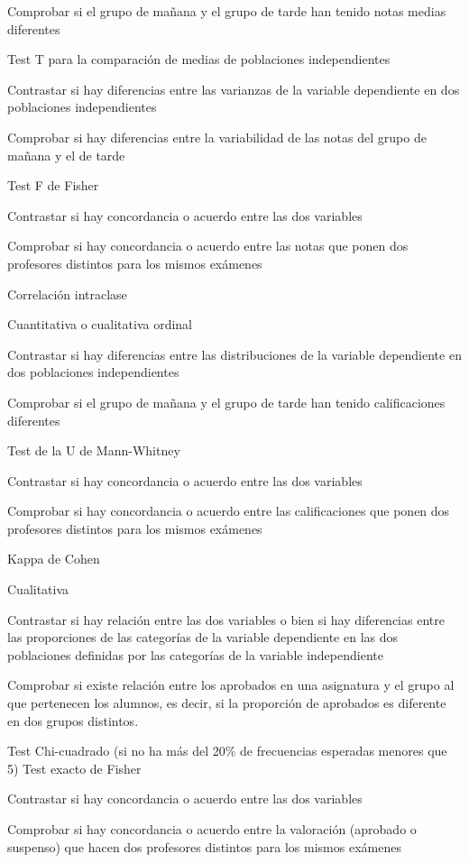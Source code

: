 \documentclass[
  spanish,
  a4paper,
]{scrreport}
\theoremstyle{definition}
\theoremstyle{definition}
\theoremstyle{remark}
\begin{document}
Comprobar si el grupo de mañana y el grupo de tarde han tenido notas
medias diferentes

Test T para la comparación de medias de poblaciones independientes

Contrastar si hay diferencias entre las varianzas de la variable
dependiente en dos poblaciones independientes

Comprobar si hay diferencias entre la variabilidad de las notas del
grupo de mañana y el de tarde

Test F de Fisher

Contrastar si hay concordancia o acuerdo entre las dos variables

Comprobar si hay concordancia o acuerdo entre las notas que ponen dos
profesores distintos para los mismos exámenes

Correlación intraclase

Cuantitativa o cualitativa ordinal

Contrastar si hay diferencias entre las distribuciones de la variable
dependiente en dos poblaciones independientes

Comprobar si el grupo de mañana y el grupo de tarde han tenido
calificaciones diferentes

Test de la U de Mann-Whitney

Contrastar si hay concordancia o acuerdo entre las dos variables

Comprobar si hay concordancia o acuerdo entre las calificaciones que
ponen dos profesores distintos para los mismos exámenes

Kappa de Cohen

Cualitativa

Contrastar si hay relación entre las dos variables o bien si hay
diferencias entre las proporciones de las categorías de la variable
dependiente en las dos poblaciones definidas por las categorías de la
variable independiente

Comprobar si existe relación entre los aprobados en una asignatura y el
grupo al que pertenecen los alumnos, es decir, si la proporción de
aprobados es diferente en dos grupos distintos.

Test Chi-cuadrado (si no ha más del 20\% de frecuencias esperadas
menores que 5) Test exacto de Fisher

Contrastar si hay concordancia o acuerdo entre las dos variables

Comprobar si hay concordancia o acuerdo entre la valoración (aprobado o
suspenso) que hacen dos profesores distintos para los mismos exámenes
\end{document}

